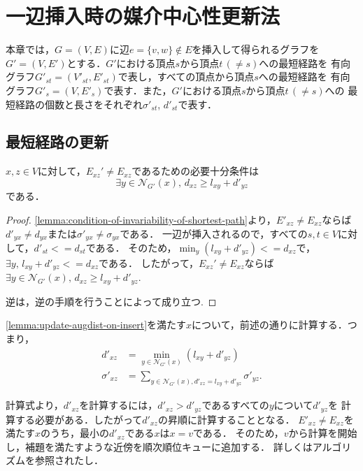 \section{一辺挿入時の媒介中心性更新法}
\label{sect:update-bc-on-insert}
本章では，$G=(V,E)$に辺$e=\{v,w\} \not\in E$を挿入して得られるグラフを
$G'=(V,E')$とする．$G'$における頂点$s$から頂点$t\,(\neq s)$への最短経路を
有向グラフ$G'_{st}=(V'_{st},E'_{st})$で表し，すべての頂点から頂点$s$への最短経路を
有向グラフ$G'_s=(V,E'_s)$で表す．また，$G'$における頂点$s$から頂点$t\,(\neq s)$への
最短経路の個数と長さをそれぞれ$\sigma'_{st}$, $d'_{st}$で表す．

\subsection{最短経路の更新}
\label{subsect:update-augdist-on-insert}

\begin{lemma}
  \label{lemma:update-augdist-on-insert}
  $x,z\in V$に対して，$E_{xz}'\neq E_{xz}$であるための必要十分条件は
  \[ \exists y\in\mathcal{N}_{G'}(x),\,d_{xz}\geq l_{xy}+d'_{yz} \]
  である．
\end{lemma}
\begin{proof}
  \ref{lemma:condition-of-invariability-of-shortest-path}より，$E'_{xz}\neq E_{xz}$ならば
  $d'_{yx}\neq d_{yx}$または$\sigma'_{yx}\neq\sigma_{yx}$である．
  一辺が挿入されるので，すべての$s,t\in V$に対して，$d'_{st}<=d_{st}$である．
  そのため，$\min_y(l_{xy}+d'_{yz})<=d_{xz}$で，$\exists y,\,l_{xy}+d'_{yz}<=d_{xz}$である．
  したがって，$E_{xz}'\neq E_{xz}$ならば$\exists y\in\mathcal{N}_{G'}(x),\,d_{xz}\geq l_{xy}+d'_{yz}$.

  逆は，逆の手順を行うことによって成り立つ.
\end{proof}

\ref{lemma:update-augdist-on-insert}を満たす$x$について，前述の通りに計算する．つまり，
\begin{align*}
  d'_{xz}&=\min_{y\in\mathcal{N}_{G'}(x)}(l_{xy}+d'_{yz})\\
  \sigma'_{xz}&=\sum_{y\in\mathcal{N}_{G'}(x),d'_{xz}=l_{xy}+d'_{yz}}\sigma'_{yz}.
\end{align*}

計算式より，$d'_{xz}$を計算するには，$d'_{xz}>d'_{yz}$であるすべての$y$について$d'_{yz}$を
計算する必要がある．したがって$d'_{xz}$の昇順に計算することとなる．
$E'_{xz}\neq E_{xz}$を満たす$x$のうち，最小の$d'_{xz}$である$x$は$x=v$である．
そのため，$v$から計算を開始し，補題を満たすような近傍を順次順位キューに追加する．
詳しくはアルゴリズムを参照されたし．

